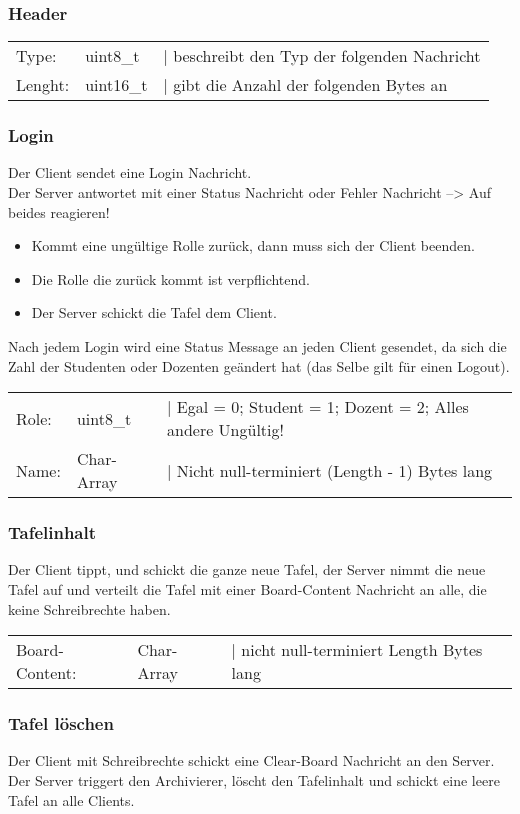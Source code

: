 \subsubsection{Header}
\begin{tabular}{lll}
Type: & uint8\_t & | beschreibt den Typ der folgenden Nachricht \\
Lenght: & uint16\_t & | gibt die Anzahl der folgenden Bytes an
\end{tabular}

\subsubsection{Login}
Der Client sendet eine Login Nachricht. \\
Der Server antwortet mit einer Status Nachricht oder Fehler Nachricht --> Auf beides reagieren!
\begin{itemize}
	\item Kommt eine ungültige Rolle zurück, dann muss sich der Client beenden.
	\item Die Rolle die zurück kommt ist verpflichtend.
	\item Der Server schickt die Tafel dem Client.
\end{itemize}
Nach jedem Login wird eine Status Message an jeden Client gesendet, da sich die Zahl der Studenten
oder Dozenten geändert hat (das Selbe gilt für einen Logout).

\begin{tabular}{lll}
Role: & uint8\_t & | Egal = 0; Student =  1; Dozent = 2; Alles andere Ungültig! \\
Name: & Char-Array & | Nicht null-terminiert (Length - 1) Bytes lang
\end{tabular}

\subsubsection{Tafelinhalt}
Der Client tippt, und schickt die ganze neue Tafel, der Server nimmt die neue Tafel auf und verteilt 
die Tafel mit einer Board-Content Nachricht an alle, die keine Schreibrechte haben.

\begin{tabular}{lll}
Board-Content: & Char-Array & | nicht null-terminiert Length Bytes lang
\end{tabular}

\subsubsection{Tafel löschen}
Der Client mit Schreibrechte schickt eine Clear-Board Nachricht an den Server. Der Server triggert 
den Archivierer, löscht den Tafelinhalt und schickt eine leere Tafel an alle Clients. 

